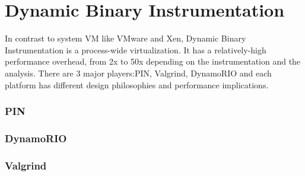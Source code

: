 \section{Dynamic Binary Instrumentation}
\label{sec:overview}
In contrast to system VM like VMware and Xen, Dynamic Binary Instrumentation is a process-wide virtualization. It has a relatively-high performance overhead, from 2x to 50x depending on the instrumentation and the analysis. There are 3 major players:PIN, Valgrind, DynamoRIO and each platform has different design philosophies and performance implications.
\subsubsection{PIN}
\subsubsection{DynamoRIO}
\subsubsection{Valgrind}
